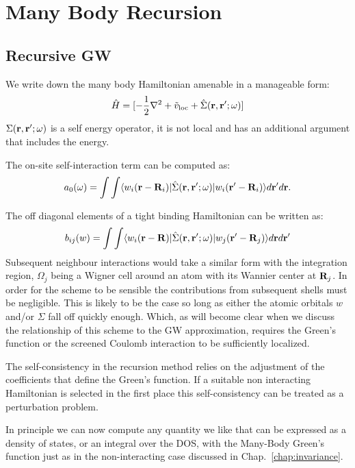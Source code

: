 \chapter{Many Body Recursion}
\label{chap:manybodyrecursion}
\section{Recursive GW}
We write down the many body Hamiltonian amenable in a manageable form:
%
\begin{equation}
\hat{H} = [-\frac{1}{2}\nabla^{2} + \tilde{v}_{\rm loc} + \hat{\Sigma}({\bf r},{\bf r}';\omega)]
\end{equation}
%
	$\Sigma({\bf r},{\bf r}';\omega)$ is a self energy operator, it is not local and 
has an additional argument that includes the energy.

The on-site self-interaction term can be computed as:
%
\begin{equation}
a_{0}(\omega) = \int\int\langle w_{i}({\bf r}-{\bf R}_{i})|\hat{\Sigma}({\bf r},{\bf r}';\omega)|w_{i}({\bf r}'-{\bf R}_{i})\rangle d{\bf r}'d{\bf r}.
\end{equation}
%

The off diagonal elements of a tight binding Hamiltonian can be written as:
%
\begin{equation}
b_{ij}(w) = \int\int\langle w_{i}({\bf r}-{\bf R})|\hat{\Sigma}({\bf r},{\bf r}';\omega)|w_{j}({\bf r}'-{\bf R}_{j})\rangle d{\bf r} d{\bf r}'
\end{equation}
%
	Subsequent neighbour interactions would take a similar form
with the integration region, $\Omega_{j}$ being a Wigner cell around an 
atom with its Wannier center at ${\bf R}_j$. In order for the scheme to be sensible 
the contributions from subsequent shells must be negligible. This is likely 
to be the case so long as either the atomic orbitals $w$ and/or $\Sigma$ 
fall off quickly enough. Which, as will become clear when we discuss
the relationship of this scheme to the GW approximation, requires 
the Green's function or the screened Coulomb interaction to be sufficiently localized.

%
The self-consistency in the recursion method relies on the adjustment of the coefficients that
define the Green's function. If a suitable non interacting Hamiltonian is selected in the first
place this self-consistency can be treated as a perturbation problem.

In principle we can now compute any quantity we like that can be expressed
as a density of states, or an integral over the DOS, with the Many-Body Green's 
function just as in the non-interacting case discussed in Chap.~\ref{chap:invariance}.

